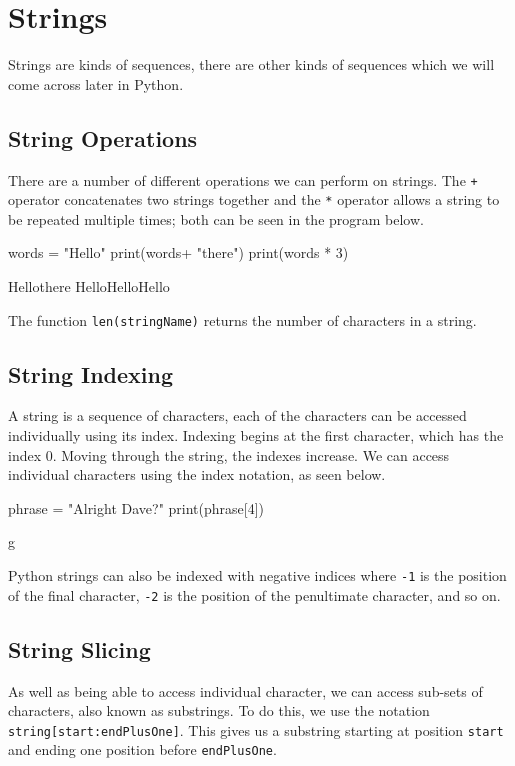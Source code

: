 
\section*{Strings}
Strings are kinds of sequences, there are other kinds of sequences which we will come across later in Python.
\subsection*{String Operations}
There are a number of different operations we can perform on strings. The \verb|+| operator concatenates two strings together and the \verb|*| operator allows a string to be repeated multiple times; both can be seen in the program below.
\begin{python}
words = "Hello"
print(words+ "there")
print(words * 3)
\end{python}
\begin{pseudo*}
Hellothere
HelloHelloHello
\end{pseudo*}
The function \verb|len(stringName)| returns the number of characters in a string.

\subsection*{String Indexing}
A string is a sequence of characters, each of the characters can be accessed individually using its index. Indexing begins at the first character, which has the index 0. Moving through the string, the indexes increase. We can access individual characters using the index notation, as seen below.
\begin{python}
phrase = "Alright Dave?"
print(phrase[4])
\end{python}
\begin{pseudo*}
g
\end{pseudo*}
Python strings can also be indexed with negative indices where \verb|-1| is the position of the final character, \verb|-2| is the position of the penultimate character, and so on.

\subsection*{String Slicing}
As well as being able to access individual character, we can access sub-sets of characters, also known as substrings. To do this, we use the notation \verb|string[start:endPlusOne]|. This gives us a substring starting at position \verb|start| and ending one position before \verb|endPlusOne|.

